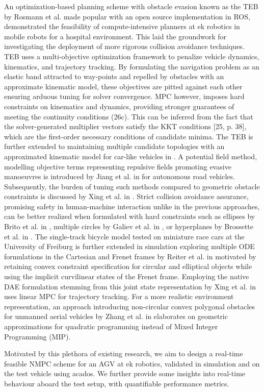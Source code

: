 \par An optimization-based planning scheme with obstacle evasion known as the \ac{TEB} by Rosmann et al. \cite{rosmann_efficient_2013} made popular with an open source implementation in \ac{ROS}, demonstrated the feasibility of compute-intensive planners at ek robotics in mobile robots for a hospital environment. This laid the groundwork for investigating the deployment of more rigorous collision avoidance techniques. \ac{TEB} uses a multi-objective optimization framework to penalize vehicle dynamics, kinematics, and trajectory tracking. By formulating the navigation problem as an elastic band attracted to way-points and repelled by obstacles with an approximate kinematic model, these objectives
are pitted against each other ensuring arduous tuning for solver convergence. MPC however, imposes hard constraints on kinematics and dynamics, providing stronger guarantees of meeting the continuity conditions (26c). This can be inferred from the fact that the solver-generated multiplier vectors satisfy the KKT conditions [25, p. 38], which are the first-order necessary conditions of candidate minima. The \ac{TEB} is further extended to maintaining multiple candidate topologies with an approximated kinematic model for car-like vehicles in \cite{rosmann_integrated_2017}. A potential field method, modelling objective terms representing repulsive fields promoting evasive manoeuvres is introduced by Jiang et al. in \cite{jiang_obstacle_2016} for autonomous road vehicles. Subsequently, the burden of tuning such methods compared to geometric obstacle constraints is discussed by Xing et al. in \cite{xing_vehicle_2022}. Strict collision avoidance assurance, promising safety in human-machine interaction unlike in the previous approaches, can be better realized when formulated with hard constraints such as ellipses by Brito et al. in \cite{brito_model_2020}, multiple circles by Galiev et al. in \cite{galiev_optimization_2019}, or hyperplanes by Brossette et al. in \cite{brossette_collision_2017}. The single-track bicycle model tested on miniature race cars at the University of Freiburg is further extended in simulation exploring multiple \ac{ODE} formulations in the Cartesian and Frenet frames by Reiter et al. in \cite{reiter_frenet-cartesian_2023} motivated by retaining convex constraint specification for circular and elliptical objects while using the implicit curvilinear states of the Frenet frame. Employing the native DAE formulation stemming from this joint state representation by Xing et al. in \cite{xing_vehicle_2022} uses linear MPC for trajectory tracking. For a more realistic environment representation, an approach introducing non-circular convex polygonal obstacles for unmanned aerial vehicles by Zhang et al. in \cite{zhang_enlarged_2023} elaborates on geometric approximations for quadratic programming instead of Mixed Integer Programming (MIP).
\par Motivated by this plethora of existing research, we aim to design a real-time feasible NMPC scheme for an \ac{AGV} at ek robotics, validated in simulation and on the test vehicle using acados. We further provide some insights into real-time behaviour aboard the test setup, with quantifiable performance metrics.

